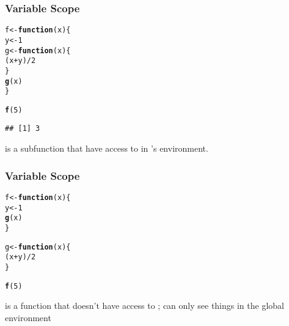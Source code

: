 \documentclass[12pt]{beamer}\usepackage[]{graphicx}\usepackage[]{color}
\makeatletter
\newcommand{\hlnum}[1]{\textcolor[rgb]{0.686,0.059,0.569}{#1}}%
\newcommand{\hlopt}[1]{\textcolor[rgb]{0,0,0}{#1}}%
\newcommand{\hlstd}[1]{\textcolor[rgb]{0.345,0.345,0.345}{#1}}%
\newcommand{\hlkwa}[1]{\textcolor[rgb]{0.161,0.373,0.58}{\textbf{#1}}}%
\newcommand{\hlkwb}[1]{\textcolor[rgb]{0.69,0.353,0.396}{#1}}%
\newcommand{\hlkwc}[1]{\textcolor[rgb]{0.333,0.667,0.333}{#1}}%
\newcommand{\hlkwd}[1]{\textcolor[rgb]{0.737,0.353,0.396}{\textbf{#1}}}%
\newenvironment{kframe}{%
 \def\at@end@of@kframe{}%
 \ifinner\ifhmode%
  \def\at@end@of@kframe{\end{minipage}}%
  \begin{minipage}{\columnwidth}%
 \fi\fi%
 \def\FrameCommand##1{\hskip\@totalleftmargin \hskip-\fboxsep
 \colorbox{shadecolor}{##1}\hskip-\fboxsep
     \hskip-\linewidth \hskip-\@totalleftmargin \hskip\columnwidth}%
 \MakeFramed {\advance\hsize-\width
   \@totalleftmargin\z@ \linewidth\hsize
   \@setminipage}}%
 {\par\unskip\endMakeFramed%
 \at@end@of@kframe}
\newenvironment{knitrout}{}{} %
\makeatother
\begin{document}
\begin{frame}[fragile]
\frametitle{Variable Scope}

\begin{knitrout}\footnotesize
{}\color{fgcolor}\begin{kframe}
\begin{alltt}
\hlstd{f} \hlkwb{<-} \hlkwa{function}\hlstd{(}\hlkwc{x}\hlstd{) \{}
  \hlstd{y} \hlkwb{<-} \hlnum{1}
  \hlstd{g} \hlkwb{<-} \hlkwa{function}\hlstd{(}\hlkwc{x}\hlstd{) \{}
    \hlstd{(x} \hlopt{+} \hlstd{y)} \hlopt{/} \hlnum{2}
  \hlstd{\}}
  \hlkwd{g}\hlstd{(x)}
\hlstd{\}}

\hlkwd{f}\hlstd{(}\hlnum{5}\hlstd{)}
\end{alltt}
\begin{verbatim}
## [1] 3
\end{verbatim}
\end{kframe}
\end{knitrout}

 is a subfunction that have access to  in 's environment.

\end{frame}


\begin{frame}[fragile]
\frametitle{Variable Scope}

\begin{knitrout}\footnotesize
{}\color{fgcolor}\begin{kframe}
\begin{alltt}
\hlstd{f} \hlkwb{<-} \hlkwa{function}\hlstd{(}\hlkwc{x}\hlstd{) \{}
  \hlstd{y} \hlkwb{<-} \hlnum{1}
  \hlkwd{g}\hlstd{(x)}
\hlstd{\}}

\hlstd{g} \hlkwb{<-} \hlkwa{function}\hlstd{(}\hlkwc{x}\hlstd{) \{}
  \hlstd{(x} \hlopt{+} \hlstd{y)} \hlopt{/} \hlnum{2}
\hlstd{\}}

\hlkwd{f}\hlstd{(}\hlnum{5}\hlstd{)}
\end{alltt}


{\ttfamily\noindent\bfseries\color{errorcolor}{\#\# Error in g(x): object 'y' not found}}\end{kframe}
\end{knitrout}

 is a function that doesn't have access to ;  can only see things in the global environment

\end{frame}
\end{document}
